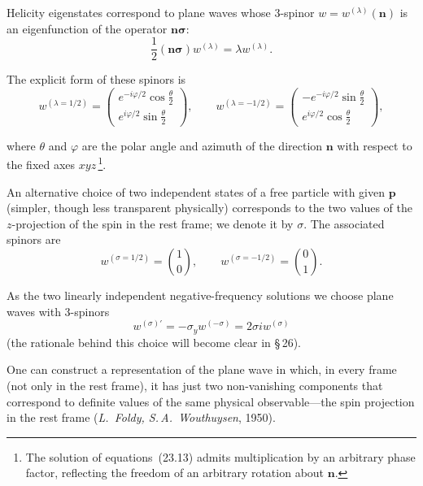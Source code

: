 Helicity eigenstates correspond to plane waves whose 3-spinor $w = w^{(\lambda)}(\mathbf{n})$ is an eigenfunction of the operator $\mathbf{n}\boldsymbol{\sigma}$:
\begin{equation}
\frac{1}{2}(\mathbf{n}\boldsymbol{\sigma})w^{(\lambda)} = \lambda w^{(\lambda)}.
\tag{23.13}
\end{equation}

The explicit form of these spinors is
\begin{equation}
w^{(\lambda = 1/2)} = \begin{pmatrix} e^{-i\varphi/2}\cos\frac{\theta}{2}\\ e^{i\varphi/2}\sin\frac{\theta}{2} \end{pmatrix},\qquad w^{(\lambda = -1/2)} = \begin{pmatrix} -e^{-i\varphi/2}\sin\frac{\theta}{2}\\ e^{i\varphi/2}\cos\frac{\theta}{2} \end{pmatrix},
\tag{23.14}
\end{equation}

where $\theta$ and $\varphi$ are the polar angle and azimuth of the direction $\mathbf{n}$ with respect to the fixed axes $xyz$\,\footnote{The solution of equations~(23.13) admits multiplication by an arbitrary phase factor, reflecting the freedom of an arbitrary rotation about $\mathbf{n}$.}.

An alternative choice of two independent states of a free particle with given $\mathbf{p}$ (simpler, though less transparent physically) corresponds to the two values of the $z$-projection of the spin in the rest frame; we denote it by $\sigma$. The associated spinors are
\begin{equation}
w^{(\sigma = 1/2)} = \binom{1}{0},\qquad w^{(\sigma = -1/2)} = \binom{0}{1}.
\tag{23.15}
\end{equation}

As the two linearly independent negative-frequency solutions we choose plane waves with 3-spinors
\begin{equation}
w^{(\sigma)\prime} = -\sigma_y w^{(-\sigma)} = 2\sigma i w^{(\sigma)}
\tag{23.16}
\end{equation}
(the rationale behind this choice will become clear in \S\,26).

One can construct a representation of the plane wave in which, in every frame (not only in the rest frame), it has just two non-vanishing components that correspond to definite values of the same physical observable---the spin projection in the rest frame (\emph{L.~Foldy, S.\,A.~Wouthuysen}, 1950).

